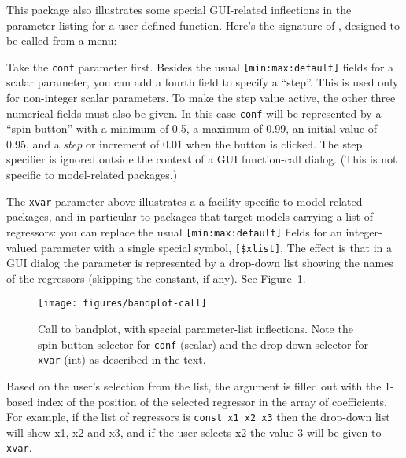 \documentclass[oneside]{book}
\begin{document}
This package also illustrates some special GUI-related inflections in
the parameter listing for a user-defined function. Here's the
signature of , designed to be called from a
menu:
%
Take the \texttt{conf} parameter first. Besides the usual
\texttt{[min:max:default]} fields for a scalar parameter, you can add
a fourth field to specify a ``step''. This is used only for
non-integer scalar parameters. To make the step value active, the
other three numerical fields must also be given.  In this case
\texttt{conf} will be represented by a ``spin-button'' with a minimum
of 0.5, a maximum of 0.99, an initial value of 0.95, and a
\textit{step} or increment of 0.01 when the button is clicked. The
step specifier is ignored outside the context of a GUI function-call
dialog. (This is not specific to model-related packages.)

The \texttt{xvar} parameter above illustrates a a facility specific to
model-related packages, and in particular to packages that target
models carrying a list of regressors: you can replace the usual
\texttt{[min:max:default]} fields for an integer-valued parameter with
a single special symbol, \texttt{[\$xlist]}.  The effect is that in a
GUI dialog the parameter is represented by a drop-down list showing
the names of the regressors (skipping the constant, if any). See
Figure~\ref{fig:bandplot-call}.

\begin{figure}[htbp]
\begin{center}
  \texttt{[image: figures/bandplot-call]}
\end{center}
\caption{Call to \textsf{bandplot}, with special parameter-list
  inflections. Note the spin-button selector for \texttt{conf}
  (scalar) and the drop-down selector for \texttt{xvar} (int)
  as described in the text.}
\label{fig:bandplot-call}
\end{figure}

Based on the user's selection from the list, the argument is filled
out with the 1-based index of the position of the selected regressor
in the array of coefficients. For example, if the list of regressors
is \texttt{const x1 x2 x3} then the drop-down list will show
\textsf{x1}, \textsf{x2} and \textsf{x3}, and if the user selects
\textsf{x2} the value 3 will be given to \texttt{xvar}.
\end{document}
